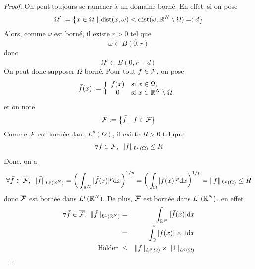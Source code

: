 \begin{proof}
    On peut toujours se ramener à un domaine borné. En effet, si on pose 
    \begin{equation*}
        \Omega':=\big\{ x \in \Omega \ | \ \mathrm{dist}(x,\omega) < \mathrm{dist}(\omega, \mathbb{R}^N \setminus \Omega)=:d \big\}
    \end{equation*}
    Alors, comme $\omega$ est borné, il existe $r>0$ tel que 
    \begin{equation*}
        \omega \subset \overline{B(0,r)}
    \end{equation*}
    donc 
    \begin{equation*}
        \Omega' \subset \overline{B(0,r+d)}
    \end{equation*}
    On peut donc supposer $\Omega$ borné. Pour tout $f \in \mathcal{F}$, on pose 
    \begin{equation*}
        \bar{f}(x) := \left\{\begin{array}{cl}
            f(x) & \text{si } x \in \Omega, \\
            0 & \text{si } x \in \mathbb{R}^N \setminus \Omega.
        \end{array}\right.
    \end{equation*}
    et on note 
    \begin{equation*}
        \overline{\mathcal{F}} := \big\{ \bar{f} \ | \ f \in \mathcal{F} \big\}
    \end{equation*}
    Comme $\mathcal{F}$ est bornée dans $L^p(\Omega)$, il existe $R>0$ tel que 
    \begin{equation*}
        \forall f \in \calF, \ \|f\|_{L^p(\Omega)} \leq R
    \end{equation*}
    Donc, on a 
    \begin{equation*}
        \forall \bar{f} \in \overline{\calF}, \ \|\bar{f}\|_{L^p(\bbR^N)} = \bigg(\int_{\bbR^N}|\bar{f}(x)|^p\d x\bigg)^{1/p} = \bigg(\int_{\Omega}|f(x)|^p\d x\bigg)^{1/p} = \|f\|_{L^p(\Omega)} \leq R
    \end{equation*}
    donc $\overline{\mathcal{F}}$ est bornée dans $L^p(\mathbb{R}^N)$. De plus, $\overline{\mathcal{F}}$ est bornée dans $L^1(\mathbb{R}^N)$, en effet 
    \begin{eqnarray*}
        \forall \bar{f} \in \overline{\calF}, \ \|\bar{f}\|_{L^1(\bbR^N)} &=& \int_{\bbR^N}|\bar{f}(x)|\d x \\
        &=& \int_{\Omega}|f(x)|\times 1 \d x \\
        \text{Hölder } &\leq& \|f\|_{L^p(\Omega)} \times \|1\|_{L^q(\Omega)} \\

\end{eqnarray*}
\end{proof}

